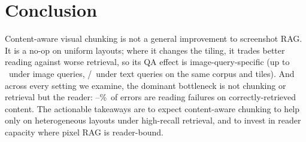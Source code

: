 \documentclass[11pt]{article}
\begin{document}
\section{Conclusion}\label{sec:conclusion}
Content-aware visual chunking is not a general improvement to screenshot RAG. It is a no-op on
uniform layouts; where it changes the tiling, it trades better reading against worse retrieval, so its
QA effect is image-query-specific (up to \CaImgHierDelta\ under image queries, \CaTxtFlatDelta/\CaTxtHierDelta\
under text queries on the same corpus and tiles). And across every setting we examine, the dominant
bottleneck is not chunking or retrieval but the reader: \ReaderCeilPctMin--\ReaderCeilPctMax\%\ of errors
are reading failures on correctly-retrieved content. The actionable takeaways are to expect content-aware
chunking to help only on heterogeneous layouts under high-recall retrieval, and to invest in reader
capacity where pixel RAG is reader-bound.



\end{document}

